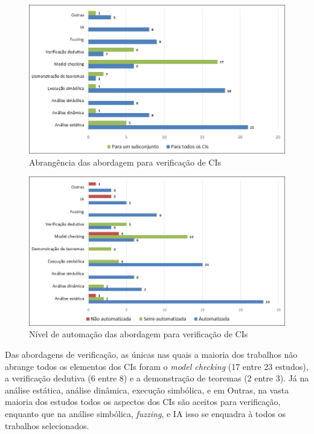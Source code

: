 \begin{figure}[!htb]
 \caption{Abrangência das abordagem para verificação de CIs}
 \label{fig:rq5-abrangencia}
 \centering
 \includegraphics[scale=0.6]{figuras/rq5-abrangencia.png}
 \fdadospesquisa
\end{figure}

\begin{figure}[!htb]
 \caption{Nível de automação das abordagem para verificação de CIs}
 \label{fig:rq5-automacao}
 \centering
 \includegraphics[scale=0.6]{figuras/rq5-automacao.png}
 \fdadospesquisa
\end{figure}





Das abordagens de verificação, as únicas nas quais a maioria dos trabalhos não abrange todos os elementos dos CIs foram o \textit{model checking} (17 entre 23 estudos), a verificação dedutiva (6 entre 8) e a demonstração de teoremas (2 entre 3). Já na análise estática, análise dinâmica, execução simbólica, e em Outras, na vasta maioria dos estudos todos os aspectos dos CIs são aceitos para verificação, enquanto que na análise simbólica, \textit{fuzzing}, e IA isso se enquadra à todos os trabalhos selecionados. 

